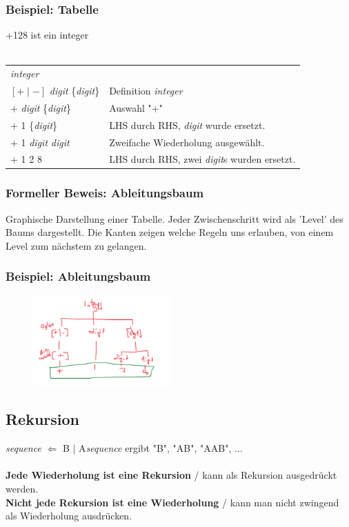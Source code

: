 \documentclass[12pt,a4paper]{article}
\begin{document}
\subsubsection*{Beispiel: Tabelle}
+128 ist ein integer\\\\
\begin{tabularx}{\linewidth}{l X}
\textit{integer} & \\
$[+\mid-]$ \textit{digit} \{\textit{digit}\} & Definition \textit{integer}\\
+ \textit{digit} \{\textit{digit}\} & Auswahl "+"\\
+ 1 \{\textit{digit}\} & LHS durch RHS, \textit{digit} wurde ersetzt.\\
+ 1 \textit{digit} \textit{digit} & Zweifache Wiederholung ausgewählt.\\
+ 1 2 8 & LHS durch RHS, zwei \textit{digit}s wurden ersetzt.
\end{tabularx}
\subsubsection{Formeller Beweis: Ableitungsbaum}
Graphische Darstellung einer Tabelle. Jeder Zwischenschritt wird als 'Level' des Baums dargestellt. Die Kanten zeigen welche Regeln uns erlauben, von einem Level zum nächstem zu gelangen.
\subsubsection{Beispiel: Ableitungsbaum} %
\begin{figure}[h!]
\includegraphics[width=200px]{ableitungsbaum-bsp.png}
\end{figure}
\subsection{Rekursion}
\textit{sequence} $\Leftarrow$ B $\mid$ A\textit{sequence} ergibt "B", "AB", "AAB", $\hdots$\\\\
\textbf{Jede Wiederholung ist eine Rekursion} / kann als Rekursion ausgedrückt werden.\\
\textbf{Nicht jede Rekursion ist eine Wiederholung} / kann man nicht zwingend als Wiederholung ausdrücken.
\end{document}
